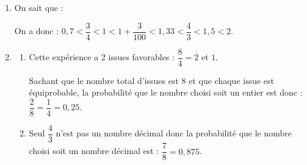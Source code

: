 \begin{enumerate}
	\item On sait que : 


On a donc : $0,7 < \dfrac{3}{4} < 1 < 1+\dfrac{3}{100} < 1,33 < \dfrac{4}{3} < 1,5 < 2 $.
	
	\item \begin{enumerate}
	\item Cette expérience a 2 issues favorables : $\dfrac{8}{4}=2$ et $1$. 
	
	\medskip
	Sachant que le nombre total d'issues est 8 et que chaque issue est équiprobable, la probabilité que le nombre choisi soit un entier est donc : $\dfrac{2}{8}=\dfrac{1}{4}=0,25$.

	\item Seul $\dfrac{4}{3}$ n'est pas un nombre décimal donc la probabilité que le nombre choisi soit un nombre décimal est : $\dfrac{7}{8}=0,875$.
	
	\end{enumerate}

\end{enumerate}